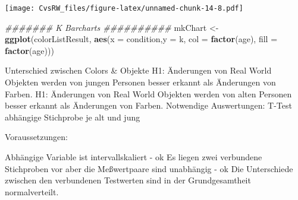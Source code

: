 \documentclass[
]{article}
\newenvironment{Shaded}{\begin{snugshade}}{\end{snugshade}}
\newcommand{\CommentTok}[1]{\textcolor[rgb]{0.56,0.35,0.01}{\textit{#1}}}
\newcommand{\DataTypeTok}[1]{\textcolor[rgb]{0.13,0.29,0.53}{#1}}
\newcommand{\DecValTok}[1]{\textcolor[rgb]{0.00,0.00,0.81}{#1}}
\newcommand{\FloatTok}[1]{\textcolor[rgb]{0.00,0.00,0.81}{#1}}
\newcommand{\KeywordTok}[1]{\textcolor[rgb]{0.13,0.29,0.53}{\textbf{#1}}}
\newcommand{\NormalTok}[1]{#1}
\newcommand{\OperatorTok}[1]{\textcolor[rgb]{0.81,0.36,0.00}{\textbf{#1}}}
\newcommand{\StringTok}[1]{\textcolor[rgb]{0.31,0.60,0.02}{#1}}
\begin{document}
\begin{Shaded}
\end{Shaded}

\texttt{[image: CvsRW\_files/figure-latex/unnamed-chunk-14-8.pdf]}

\begin{Shaded}
\begin{Highlighting}[]
\CommentTok{####### K Barcharts ##########}
\NormalTok{mkChart <-}\StringTok{ }\KeywordTok{ggplot}\NormalTok{(colorListResult, }\KeywordTok{aes}\NormalTok{(}\DataTypeTok{x =}\NormalTok{ condition,}\DataTypeTok{y =}\NormalTok{ k, }\DataTypeTok{col =} \KeywordTok{factor}\NormalTok{(age), }\DataTypeTok{fill =} \KeywordTok{factor}\NormalTok{(age)))}
\end{Highlighting}
\end{Shaded}

Unterschied zwischen Colors \& Objekte H1: Änderungen von Real World
Objekten werden von jungen Personen besser erkannt als Änderungen von
Farben. H1: Änderungen von Real World Objekten werden von alten Personen
besser erkannt als Änderungen von Farben. Notwendige Auswertungen:
T-Test abhängige Stichprobe je alt und jung

Voraussetzungen:

Abhängige Variable ist intervallskaliert - ok Es liegen zwei verbundene
Stichproben vor aber die Meßwertpaare sind unabhängig - ok Die
Unterschiede zwischen den verbundenen Testwerten sind in der
Grundgesamtheit normalverteilt.

\begin{Shaded}
\end{Shaded}
\end{document}
